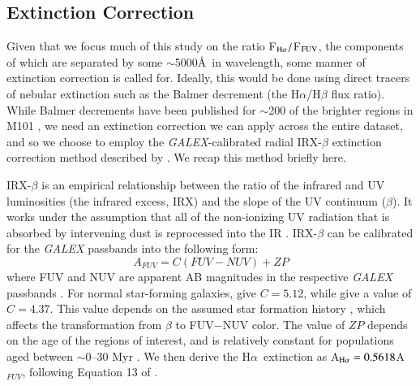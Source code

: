 \documentclass[iop]{emulateapj}
\newcommand{\ha}{H$\alpha$}
\newcommand{\hafuv}{F$_{\rm H\alpha}/$F$_{\rm FUV}$}
\begin{document}
\subsection{Extinction Correction}
Given that we focus much of this study on the ratio \hafuv, the
components of which are separated by some $\sim$5000\AA \ in
wavelength, some manner of extinction correction is called for.
Ideally, this would be done using direct tracers of nebular extinction
such as the Balmer decrement (the H$\alpha$/H$\beta$ flux ratio).
While Balmer decrements have been published for $\sim$200 of the
brighter  regions in M101 \citep{scowen92}, we need an extinction
correction we can apply across the entire dataset, and so we choose to
employ the \emph{GALEX}-calibrated radial IRX-$\beta$ extinction correction
method described by \citet[in their Section 3.6]{goddard10}.  We recap
this method briefly here.

IRX-$\beta$ is an empirical relationship between the ratio of the
infrared and UV luminosities (the infrared excess, IRX) and the slope
of the UV continuum ($\beta$).  It works under the assumption that all
of the non-ionizing UV radiation that is absorbed by intervening dust
is reprocessed into the IR \citep{heckman95, meurer95, meurer99}.
IRX-$\beta$ can be calibrated for the \emph{GALEX} passbands into the
following form:
\begin{equation}
A_{FUV} = C(FUV-NUV)+ZP
\end{equation}
where FUV and NUV are apparent AB magnitudes in
  the respective \emph{GALEX} passbands \citep{calzetti01, seibert05,
  cortese06, goddard10}. For normal star-forming galaxies,
\citet{cortese06} give $C=5.12$, while \citet{seibert05} give a value
of $C=4.37$.  This value depends on the assumed star formation history
\citep[e.g.][]{calzetti05}, which affects the transformation from
$\beta$ to FUV$-$NUV color.  The value of $ZP$ depends on the age of
the regions of interest, and is relatively constant for populations
aged between $\sim$0--30 Myr \citep[Figure 9 in][]{goddard10}.
  We then derive the \ha \ extinction as A$_{\rm H\alpha} =
  0.5618$A$_{FUV}$, following Equation 13 of \citet{calzetti01}.
\end{document}
